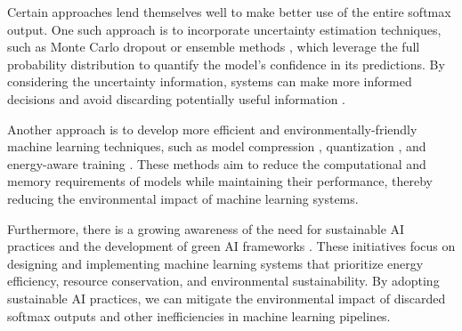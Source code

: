 Certain approaches lend themselves well to make better use of the entire softmax output. One such approach is to incorporate uncertainty estimation techniques, such as Monte Carlo dropout \cite{gal2016dropout} or ensemble methods \cite{lakshminarayanan2017simple}, which leverage the full probability distribution to quantify the model's confidence in its predictions. By considering the uncertainty information, systems can make more informed decisions and avoid discarding potentially useful information \cite{kendall2017uncertainties}.

Another approach is to develop more efficient and environmentally-friendly machine learning techniques, such as model compression \cite{han2015deep}, quantization \cite{gholami2021survey}, and energy-aware training \cite{garcia2021estimation}. These methods aim to reduce the computational and memory requirements of models while maintaining their performance, thereby reducing the environmental impact of machine learning systems.

Furthermore, there is a growing awareness of the need for sustainable AI practices and the development of green AI frameworks \cite{schwartz2020green}. These initiatives focus on designing and implementing machine learning systems that prioritize energy efficiency, resource conservation, and environmental sustainability. By adopting sustainable AI practices, we can mitigate the environmental impact of discarded softmax outputs and other inefficiencies in machine learning pipelines.




